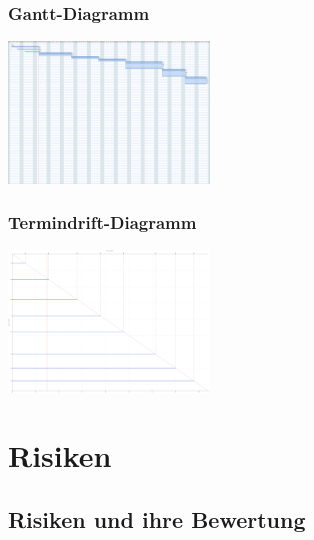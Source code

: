 \documentclass[11pt]{article}
\begin{document}
\subsubsection{Gantt-Diagramm}
\begin{center}
	\includegraphics[width=0.4\textwidth]{Tourney.png}
\end{center}
\subsubsection{Termindrift-Diagramm}
\begin{center}
	\includegraphics[width=0.4\textwidth]{TourneyTerminDrift.png}
\end{center}
\section{Risiken}

\subsection{Risiken und ihre Bewertung}
\end{document}
